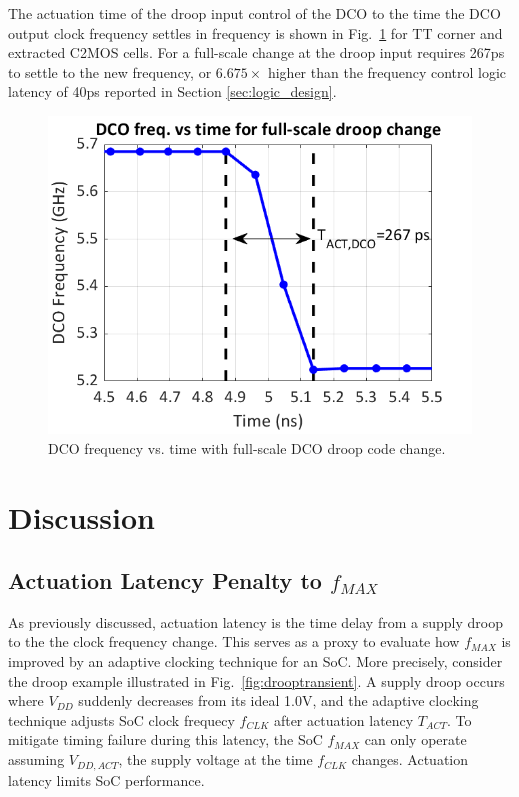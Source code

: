 \documentclass[twoside,9pt,journal,letterpage]{IEEEtran}
\begin{document}
The actuation time of the droop input control of the DCO to the time the DCO output clock frequency settles in frequency is shown in Fig.\ \ref{fig:dco_response} for TT corner and extracted C2MOS cells. For a full-scale change at the droop input requires 267ps to settle to the new frequency, or $6.675\times$ higher than the frequency control logic latency of 40ps reported in Section \ref{sec:logic_design}.

\vspace{-10pt}
\begin{figure}[h]
	\centering
	\includegraphics[width=0.7\columnwidth]{fig_dco_response}
	\caption{DCO frequency vs. time with full-scale DCO droop code change.}
	\label{fig:dco_response}
\end{figure}

\section{Discussion}
\label{sec:discussion}
\subsection{Actuation Latency Penalty to $f_{MAX}$}
\label{sec:actuation_latency}
As previously discussed, actuation latency is the time delay from a supply droop to the the clock frequency change. This serves as a proxy to evaluate how $f_{MAX}$ is improved by an adaptive clocking technique for an SoC. More precisely, consider the droop example illustrated in Fig.\ \ref{fig:drooptransient}. A supply droop occurs where $V_{DD}$ suddenly decreases from its ideal 1.0V, and the adaptive clocking technique adjusts SoC clock frequecy $f_{CLK}$ after actuation latency $T_{ACT}$. To mitigate timing failure during this latency, the SoC $f_{MAX}$ can only operate assuming $V_{DD,ACT}$, the supply voltage at the time $f_{CLK}$ changes. Actuation latency limits SoC performance.
\end{document}
